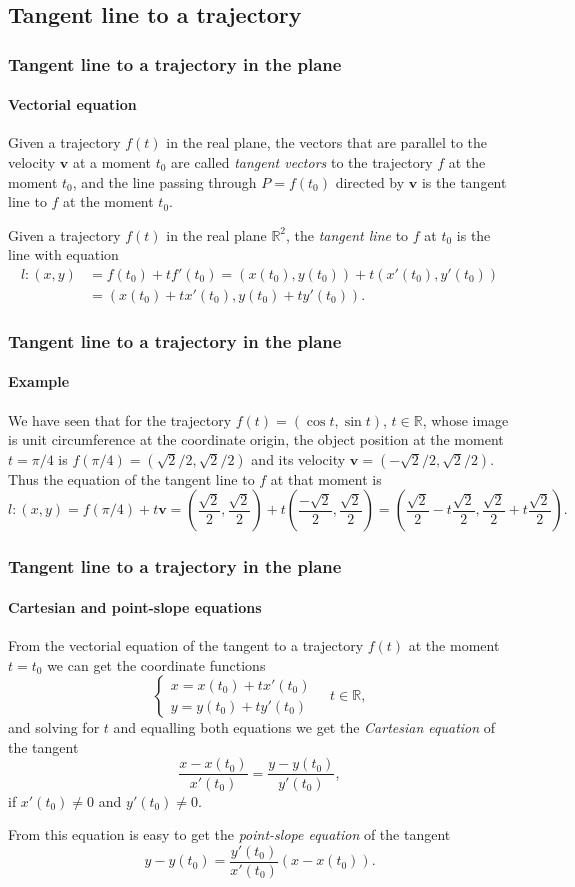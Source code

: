 \subsection{Tangent line to a trajectory}
\begin{frame}
\frametitle{Tangent line to a trajectory in the plane}
\framesubtitle{Vectorial equation}
Given a trajectory $f(t)$ in the real plane, the vectors that are parallel to the velocity $\mathbf{v}$ at a moment $t_0$ are called \emph{tangent vectors} to the trajectory $f$ at the moment $t_0$, and the line passing through $P=f(t_0)$ directed by $\mathbf{v}$ is the tangent line to $f$ at the moment $t_0$.

\begin{definition}
Given a trajectory $f(t)$ in the real plane $\mathbb{R}^2$, the \emph{tangent line} to $f$ at $t_0$ is the line with equation
\begin{align*}
l:(x,y) &= f(t_0)+tf'(t_0) = (x(t_0),y(t_0))+t(x'(t_0),y'(t_0))\\
& = (x(t_0)+tx'(t_0),y(t_0)+ty'(t_0)).
\end{align*}
\end{definition}
\end{frame}


\begin{frame}
\frametitle{Tangent line to a trajectory in the plane}
\framesubtitle{Example}
We have seen that for the trajectory $f(t) = (\cos t,\sin t)$, $t\in \mathbb{R}$, whose image is unit circumference at the coordinate origin, the object position at the moment $t=\pi/4$ is $f(\pi/4)=(\sqrt{2}/2,\sqrt{2}/2)$ and its velocity $\mathbf{v}=(-\sqrt{2}/2,\sqrt{2}/2)$. 
Thus the equation of the tangent line to $f$ at that moment is 
\[
l: (x,y) = f(\pi/4)+t\mathbf{v} =
\left(\frac{\sqrt{2}}{2},\frac{\sqrt{2}}{2}\right)+t\left(\frac{-\sqrt{2}}{2},\frac{\sqrt{2}}{2}\right) =
\left(\frac{\sqrt{2}}{2}-t\frac{\sqrt{2}}{2},\frac{\sqrt{2}}{2}+t\frac{\sqrt{2}}{2}\right).
\]
\end{frame}


\begin{frame}
\frametitle{Tangent line to a trajectory in the plane}
\framesubtitle{Cartesian and point-slope equations}
From the vectorial equation of the tangent to a trajectory $f(t)$ at the moment $t=t_0$ we can get the coordinate functions
\[
\begin{cases}
x=x(t_0)+tx'(t_0)\\
y=y(t_0)+ty'(t_0)
\end{cases}
\quad t\in \mathbb{R},
\]
and solving for $t$ and equalling both equations we get the \emph{Cartesian equation} of the tangent
\[
\frac{x-x(t_0)}{x'(t_0)}=\frac{y-y(t_0)}{y'(t_0)},
\]
if $x'(t_0)\neq 0$ and $y'(t_0)\neq 0$.

From this equation is easy to get the \emph{point-slope equation} of the tangent
\[
y-y(t_0)=\frac{y'(t_0)}{x'(t_0)}(x-x(t_0)).
\]
\end{frame}


